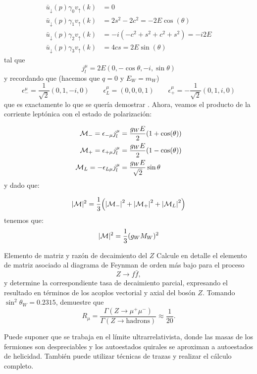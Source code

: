 \begin{align*}
    \bar{u}_\downarrow (p) \gamma_0 {v}_\uparrow (k) & = 0 \\
    \bar{u}_\downarrow (p) \gamma_1 {v}_\uparrow (k) & = 2s^2-2c^2 = - 2E\cos (\theta)  \\
    \bar{u}_\downarrow (p) \gamma_2 {v}_\uparrow (k) & = -i(-c^2 + s^2 + c^2 + s^2 ) = - i2E \\
    \bar{u}_\downarrow (p) \gamma_3 {v}_\uparrow (k) & = 4 c s = 2E \sin (\theta)  
\end{align*}
tal que
\begin{equation}
	j_l^\mu = 2E(0,-\cos \theta, -i,\sin \theta)
\end{equation}
y recordando que (hacemos que $q=0$ y $E_W=m_W$)
\begin{equation}
	\epsilon_- ^\mu = \frac{1}{\sqrt{2}} (0,1,-i,0) \qquad \epsilon_L^\mu = (0,0,0,1) \qquad \epsilon_+^\mu = - \frac{1}{\sqrt{2}} (0,1,i,0)
\end{equation}
que es exactamente lo que se quería demostrar \cite{SaboridoSilva2025ParticlePhysicsI,thomson_modern_physics}. Ahora, veamos el producto de la corriente leptónica con el estado de polarización: 

\begin{align}
	\mathcal{M}_{-} = \epsilon_{-\mu}j_{l}^{\mu} & = \frac{g_WE}{2} (1+\cos (\theta))  \\
	\mathcal{M}_{+} = \epsilon_{+\mu}j_{l}^{\mu} & = \frac{g_WE}{2} (1-\cos (\theta))   \\
	\mathcal{M}_{L} = -\epsilon_{L\mu}j_{l}^{\mu} & = \frac{g_WE}{\sqrt{2}}   \sin \theta
\end{align}
y dado que: 

\begin{equation}
	|\Mcal|^2 = \frac{1}{3}\pqty{\vqty{\Mcal_{-}}^2 + \vqty{\Mcal_{+}}^2 + \vqty{\Mcal_{L}}^2}
\end{equation}
tenemos que:
\begin{equation}
	|\mathcal{M}|^2 = \frac{1}{3} (g_W M_W)^2
\end{equation}



\begin{Ejercicio}{Elemento de matriz y razón de decaimiento del $Z$}\label{Ej:18}
Calcule en detalle el elemento de matriz asociado al diagrama de Feynman de orden más bajo para el proceso
\[
Z \to f \bar{f},
\]
y determine la correspondiente tasa de decaimiento parcial, expresando el resultado en términos de los acoplos vectorial y axial del bosón $Z$.  
Tomando $\sin^2 \theta_W = 0.2315$, demuestre que
\[
R_\mu = 
\frac{\Gamma(Z \to \mu^+ \mu^-)}{\Gamma(Z \to \text{hadrons})}
\approx \frac{1}{20}.
\]

\medskip
Puede suponer que se trabaja en el límite ultrarrelativista, donde las masas de los fermiones son despreciables y los autoestados quirales se aproximan a autoestados de helicidad.  
También puede utilizar técnicas de trazas y realizar el cálculo completo.
\end{Ejercicio}


